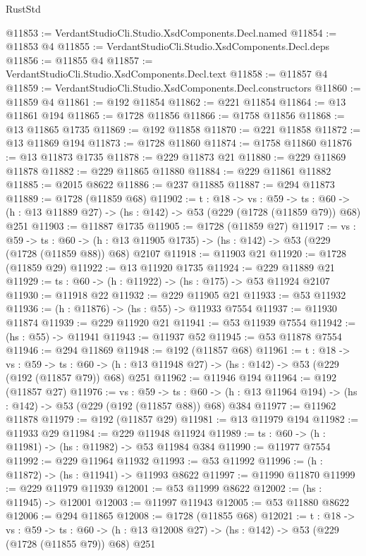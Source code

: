 \begin{lexlean}{RustStd}
\begin{coremodule}
@11853 := VerdantStudioCli.Studio.XsdComponents.Decl.named
@11854 := @11853 @4
@11855 := VerdantStudioCli.Studio.XsdComponents.Decl.deps
@11856 := @11855 @4
@11857 := VerdantStudioCli.Studio.XsdComponents.Decl.text
@11858 := @11857 @4
@11859 := VerdantStudioCli.Studio.XsdComponents.Decl.constructors
@11860 := @11859 @4
@11861 := @192 @11854
@11862 := @221 @11854
@11864 := @13 @11861 @194
@11865 := @1728 @11856
@11866 := @1758 @11856
@11868 := @13 @11865 @1735
@11869 := @192 @11858
@11870 := @221 @11858
@11872 := @13 @11869 @194
@11873 := @1728 @11860
@11874 := @1758 @11860
@11876 := @13 @11873 @1735
@11878 := @229 @11873 @21
@11880 := @229 @11869 @11878
@11882 := @229 @11865 @11880
@11884 := @229 @11861 @11882
@11885 := @2015 @8622
@11886 := @237 @11885
@11887 := @294 @11873
@11889 := @1728 (@11859 @68)
@11902 := {t : @18} ->
  {vs : @59} ->
  {ts : @60} -> (h : @13 @11889 @27) -> (hs : @142) -> @53 (@229 (@1728 (@11859 @79)) @68) @251
@11903 := @11887 @1735
@11905 := @1728 (@11859 @27)
@11917 := {vs : @59} ->
  {ts : @60} -> (h : @13 @11905 @1735) -> (hs : @142) -> @53 (@229 (@1728 (@11859 @88)) @68) @2107
@11918 := @11903 @21
@11920 := @1728 (@11859 @29)
@11922 := @13 @11920 @1735
@11924 := @229 @11889 @21
@11929 := {ts : @60} -> (h : @11922) -> (hs : @175) -> @53 @11924 @2107
@11930 := @11918 @22
@11932 := @229 @11905 @21
@11933 := @53 @11932
@11936 := (h : @11876) -> (hs : @55) -> @11933 @7554
@11937 := @11930 @11874
@11939 := @229 @11920 @21
@11941 := @53 @11939 @7554
@11942 := (hs : @55) -> @11941
@11943 := @11937 @52
@11945 := @53 @11878 @7554
@11946 := @294 @11869
@11948 := @192 (@11857 @68)
@11961 := {t : @18} ->
  {vs : @59} ->
  {ts : @60} -> (h : @13 @11948 @27) -> (hs : @142) -> @53 (@229 (@192 (@11857 @79)) @68) @251
@11962 := @11946 @194
@11964 := @192 (@11857 @27)
@11976 := {vs : @59} ->
  {ts : @60} -> (h : @13 @11964 @194) -> (hs : @142) -> @53 (@229 (@192 (@11857 @88)) @68) @384
@11977 := @11962 @11878
@11979 := @192 (@11857 @29)
@11981 := @13 @11979 @194
@11982 := @11933 @29
@11984 := @229 @11948 @11924
@11989 := {ts : @60} -> (h : @11981) -> (hs : @11982) -> @53 @11984 @384
@11990 := @11977 @7554
@11992 := @229 @11964 @11932
@11993 := @53 @11992
@11996 := (h : @11872) -> (hs : @11941) -> @11993 @8622
@11997 := @11990 @11870
@11999 := @229 @11979 @11939
@12001 := @53 @11999 @8622
@12002 := (hs : @11945) -> @12001
@12003 := @11997 @11943
@12005 := @53 @11880 @8622
@12006 := @294 @11865
@12008 := @1728 (@11855 @68)
@12021 := {t : @18} ->
  {vs : @59} ->
  {ts : @60} -> (h : @13 @12008 @27) -> (hs : @142) -> @53 (@229 (@1728 (@11855 @79)) @68) @251

\end{coremodule}
\end{lexlean}
